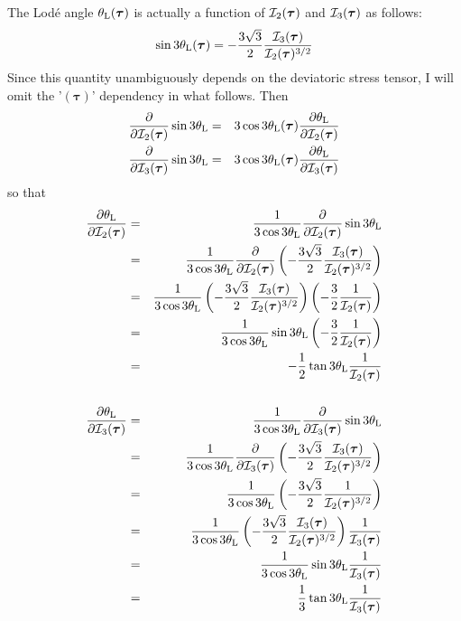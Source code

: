 The Lod\'e angle $\theta_{\rm L}(\bm\tau)$ 
is actually a function of ${\cal I}_2(\bm\tau)$ and ${\cal I}_3(\bm\tau)$ as follows:
\[
\sin 3\theta_{\rm L}(\bm\tau) = 
-\frac{3\sqrt{3}}{2}  \frac{{\cal I}_3(\bm\tau)}{{\cal I}_2(\bm\tau)^{3/2}} 
\]
Since this quantity unambiguously depends on the deviatoric stress tensor, 
I will omit the '$(\bm\tau)$' dependency in what follows.
Then
\begin{eqnarray}
\frac{\partial }{\partial {\cal I}_2(\bm\tau)} \sin 3\theta_{\rm L}
&=&3\cos 3\theta_{\rm L}(\bm\tau)  \frac{\partial \theta_{\rm L}}{\partial {\cal I}_2(\bm\tau)}\nonumber\\
\frac{\partial }{\partial {\cal I}_3(\bm\tau)} \sin 3\theta_{\rm L}
&=&3 \cos 3\theta_{\rm L}(\bm\tau)  \frac{\partial \theta_{\rm L}}{\partial {\cal I}_3(\bm\tau)}\nonumber
\end{eqnarray}
so that 
\begin{eqnarray}
\frac{\partial \theta_{\rm L}}{\partial {\cal I}_2(\bm\tau)}
&=&\frac{1}{3 \cos 3\theta_{\rm L}} 
\frac{\partial }{\partial {\cal I}_2(\bm\tau)} \sin 3\theta_{\rm L}  \nonumber\\
&=&\frac{1}{3 \cos 3\theta_{\rm L}} 
\frac{\partial }{\partial {\cal I}_2(\bm\tau)}
\left(-\frac{3\sqrt{3}}{2}  \frac{{\cal I}_3(\bm\tau)}{{\cal I}_2(\bm\tau)^{3/2}} \right) \nonumber\\
&=&\frac{1}{3 \cos 3\theta_{\rm L}} 
\left(-\frac{3\sqrt{3}}{2}  \frac{{\cal I}_3(\bm\tau)}{{\cal I}_2(\bm\tau)^{3/2}} \right)
\left( -\frac32 \frac{1}{ {\cal I}_2(\bm\tau)}\right) \nonumber\\
&=&\frac{1}{3 \cos 3\theta_{\rm L}} 
\sin 3\theta_{\rm L}
\left( -\frac32 \frac{1}{ {\cal I}_2(\bm\tau)}\right) \nonumber\\
&=& -\frac12 \tan 3\theta_{\rm L} \frac{1}{ {\cal I}_2(\bm\tau)}  
\nonumber\\
\nonumber\\
\frac{\partial \theta_{\rm L}}{\partial {\cal I}_3(\bm\tau)}
&=&\frac{1}{3 \cos 3\theta_{\rm L}} 
\frac{\partial }{\partial {\cal I}_3(\bm\tau)} \sin 3\theta_{\rm L} \nonumber \\
&=&\frac{1}{3 \cos 3\theta_{\rm L}} 
\frac{\partial }{\partial {\cal I}_3(\bm\tau)} 
\left(
-\frac{3\sqrt{3}}{2}  \frac{{\cal I}_3(\bm\tau)}{{\cal I}_2(\bm\tau)^{3/2}} 
\right) \nonumber\\
&=&\frac{1}{3 \cos 3\theta_{\rm L}} 
\left(
-\frac{3\sqrt{3}}{2}  \frac{1}{ {\cal I}_2(\bm\tau)^{3/2}} 
\right) \nonumber\\
&=&\frac{1}{3 \cos 3\theta_{\rm L}} 
\left(
-\frac{3\sqrt{3}}{2}  \frac{{\cal I}_3(\bm\tau)}{{\cal I}_2(\bm\tau)^{3/2}} 
\right)
\frac{1}{{\cal I}_3(\bm\tau)} \nonumber\\
&=&\frac{1}{3 \cos 3\theta_{\rm L}} 
\sin 3 \theta_{\rm L}
\frac{1}{{\cal I}_3(\bm\tau)}\nonumber \\
&=& \frac13 \tan 3\theta_{\rm L} \frac{1}{{\cal I}_3(\bm\tau)} \nonumber
\end{eqnarray}

